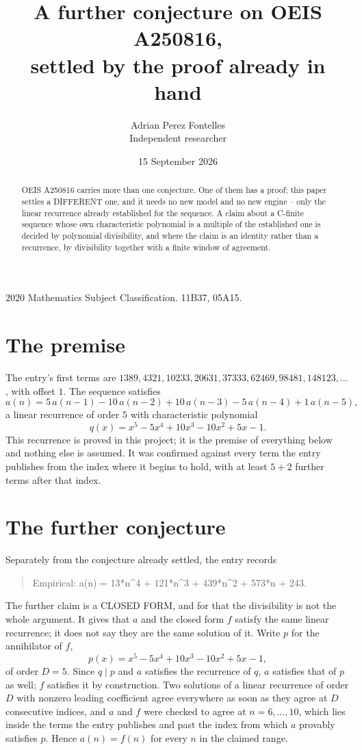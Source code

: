 \documentclass[11pt,a4paper]{article}
\title{A further conjecture on OEIS A250816,\\ \large settled by the proof already in hand}
\author{Adrian Perez Fontelles\\ \small Independent researcher}
\date{15 September 2026}
\theoremstyle{plain}
\theoremstyle{definition}
\begin{document}
\maketitle

\begin{abstract}
OEIS A250816 carries more than one conjecture. One of them has a proof; this paper settles a
DIFFERENT one, and it needs no new model and no new engine -- only the linear recurrence already
established for the sequence. A claim about a C-finite sequence whose own characteristic
polynomial is a multiple of the established one is decided by polynomial divisibility, and where
the claim is an identity rather than a recurrence, by divisibility together with a finite window
of agreement.
\end{abstract}

\noindent\small 2020 Mathematics Subject Classification. 11B37, 05A15.\normalsize

\section{The premise}

The entry's first terms are $1389, 4321, 10233, 20631, 37333, 62469, 98481, 148123,\dots$, with offset $1$. The sequence satisfies
\[
  a(n)=5\,a(n-1) - 10\,a(n-2) + 10\,a(n-3) - 5\,a(n-4) + 1\,a(n-5) ,
\]
a linear recurrence of order $5$ with characteristic polynomial
\[
  q(x)=x^{5} - 5 x^{4} + 10 x^{3} - 10 x^{2} + 5 x - 1 .
\]
This recurrence is proved in this project; it is the premise of everything below and nothing else is assumed.
It was confirmed against every term the entry publishes from the index where it begins to hold,
with at least $5+2$ further terms after that index.

\section{The further conjecture}

Separately from the conjecture already settled, the entry records

\begin{quote}\raggedright Empirical: a(n) = 13*n\^{}4 + 121*n\^{}3 + 439*n\^{}2 + 573*n + 243.\end{quote}

The further claim is a CLOSED FORM, and for that the divisibility is not the whole argument. It
gives that $a$ and the closed form $f$ satisfy the same linear recurrence; it does not say they
are the same solution of it. Write $p$ for the annihilator of $f$,
\[
  p(x)=x^{5} - 5 x^{4} + 10 x^{3} - 10 x^{2} + 5 x - 1 ,
\]
of order $D=5$. Since $q\mid p$ and $a$ satisfies the recurrence of $q$, $a$ satisfies that of
$p$ as well; $f$ satisfies it by construction. Two solutions of a linear recurrence of order $D$
with nonzero leading coefficient agree everywhere as soon as they agree at $D$ consecutive
indices, and $a$ and $f$ were checked to agree at $n=6,\dots,10$,
which lies inside the terms the entry publishes and past the index from which $a$ provably
satisfies $p$. Hence $a(n)=f(n)$ for every $n$ in the claimed range.
\end{document}
